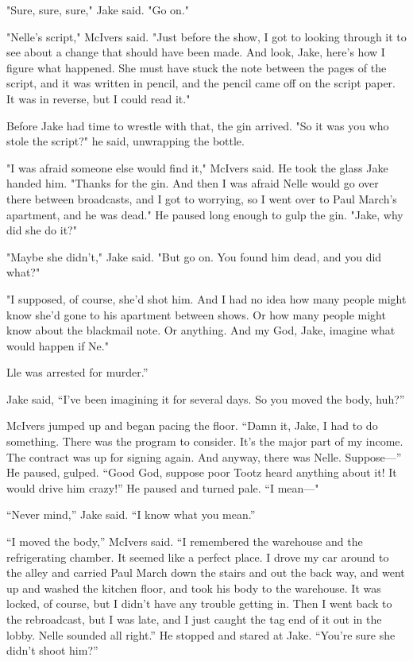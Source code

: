 \documentclass{novel}
\begin{document}
"Sure, sure, sure," Jake said. "Go on."

"Nelle's script," McIvers said. "Just before the show, I got to looking through it to see about a change that should have been made. And look, Jake, here's how I figure what happened. She must have stuck the note between the pages of the script, and it was written in pencil, and the pencil came off on the script paper. It was in reverse, but I could read it."

Before Jake had time to wrestle with that, the gin arrived. "So it was you who stole the script?" he said, unwrapping the bottle.

"I was afraid someone else would find it," McIvers said. He took the glass Jake handed him. "Thanks for the gin. And then I was afraid Nelle would go over there between broadcasts, and I got to worrying, so I went over to Paul March's apartment, and he was dead." He paused long enough to gulp the gin. "Jake, why did she do it?"

"Maybe she didn't," Jake said. "But go on. You found him dead, and you did what?"

"I supposed, of course, she'd shot him. And I had no idea how many people might know she'd gone to his apartment between shows. Or how many people might know about the blackmail note. Or anything. And my God, Jake, imagine what would happen if Ne."

Lle was arrested for murder.”

Jake said, “I’ve been imagining it for several days. So you moved the body, huh?”

McIvers jumped up and began pacing the floor. “Damn it, Jake, I had to do something. There was the program to consider. It’s the major part of my income. The contract was up for signing again. And anyway, there was Nelle. Suppose—” He paused, gulped. “Good God, suppose poor Tootz heard anything about it! It would drive him crazy!” He paused and turned pale. “I mean—"

“Never mind,” Jake said. “I know what you mean.”

“I moved the body,” McIvers said. “I remembered the warehouse and the refrigerating chamber. It seemed like a perfect place. I drove my car around to the alley and carried Paul March down the stairs and out the back way, and went up and washed the kitchen floor, and took his body to the warehouse. It was locked, of course, but I didn’t have any trouble getting in. Then I went back to the rebroadcast, but I was late, and I just caught the tag end of it out in the lobby. Nelle sounded all right.” He stopped and stared at Jake. “You’re sure she didn’t shoot him?”
\end{document}
